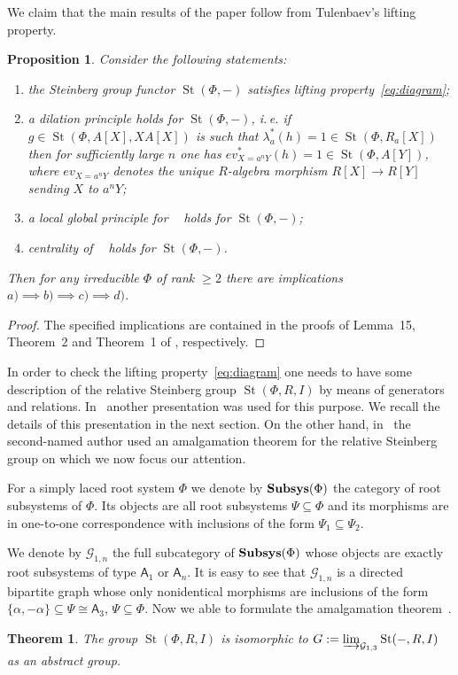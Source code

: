 \documentclass[11pt]{amsart}
\theoremstyle{plain} \declaretheorem[name=Theorem, Refname={Theorem,Theorems}]{tm} \Crefname{tm}{Theorem}{Theorems}
\numberwithin{equation}{section}
\newtheorem{prop}[lm]{Proposition} \Crefname{prop}{Proposition}{Propositions}
\newtheorem*{tm*}{Theorem}
\theoremstyle{definition} \newtheorem{df}[lm]{Definition} \Crefname{df}{Definition}{Definitions}
\theoremstyle{remark} \newtheorem{rk}[lm]{Remark} \Crefname{rk}{Remark}{Remarks}
\newcommand{\St}{\mathop{\mathrm{St}}\nolimits}
\newcommand{\Kt}{\mathop{\mathrm{K_2}}\nolimits}
\newcommand{\rA}{\mathsf{A}}
\newcommand{\catname}[1]{{\normalfont\textbf{#1}}}
\begin{document}
We claim that the main results of the paper follow from Tulenbaev's lifting property.
\begin{prop} Consider the following statements:
\begin{enumerate}
 \item the Steinberg group functor $\St(\Phi, -)$ satisfies lifting property~\eqref{eq:diagram};
 \item a dilation principle holds for $\St(\Phi, -)$, i.\,e. if $g\in\St(\Phi, A[X], XA[X])$ is such that $\lambda_a^*(h) = 1 \in \St(\Phi, R_a[X])$ then
       for sufficiently large $n$ one has $ev_{X = a^n Y}^*(h) = 1 \in \St(\Phi, A[Y])$, where $ev_{X=a^n Y}$ denotes the unique $R$-algebra morphism $R[X]\to R[Y]$ sending $X$ to $a^nY$;
 \item a local global principle for $\Kt$ holds for $\St(\Phi, -)$;
 \item centrality of $\Kt$ holds for $\St(\Phi, -)$.
\end{enumerate}
Then for any irreducible $\Phi$ of rank $\geq 2$ there are implications $a) \implies b) \implies c) \implies d)$. \end{prop}
\begin{proof} The specified implications are contained in the proofs of Lemma~15, Theorem~2 and Theorem~1 of \cite{SCh}, respectively. \end{proof}
     
In order to check the lifting property~\eqref{eq:diagram} one needs to have some description of the relative Steinberg group $\St(\Phi, R, I)$ by means of generators and relations.
In~\cite{Tul} another presentation was used for this purpose. We recall the details of this presentation in the next section.
On the other hand, in~\cite{SCh} the second-named author used an amalgamation theorem for the relative Steinberg group on which we now focus our attention.

For a simply laced root system $\Phi$ we denote by $\catname{Subsys}(\Phi)$ the category of root subsystems of $\Phi$.
Its objects are all root subsystems $\Psi\subseteq \Phi$ and its morphisms are in one-to-one correspondence with inclusions of the form $\Psi_1\subseteq \Psi_2$.

We denote by $\mathcal{G}_{1,n}$ the full subcategory of $\catname{Subsys}(\Phi)$ whose objects are exactly root subsystems of type $\rA_1$ or $\rA_n$. 
It is easy to see that $\mathcal{G}_{1,n}$ is a directed bipartite graph whose only nonidentical morphisms are inclusions of the form $\{\alpha, -\alpha\} \subseteq \Psi \cong \rA_3$, $\Psi \subseteq \Phi$.
Now we able to formulate the amalgamation theorem~\cite[Theorem~9]{SCh}.
\begin{tm*} \label{tm:relPres} The group $\St(\Phi, R, I)$ is isomorphic to $G:=\varinjlim_{\mathcal{G}_{1,3}}\St(-, R, I)$ as an abstract group. \end{tm*}
\end{document}
